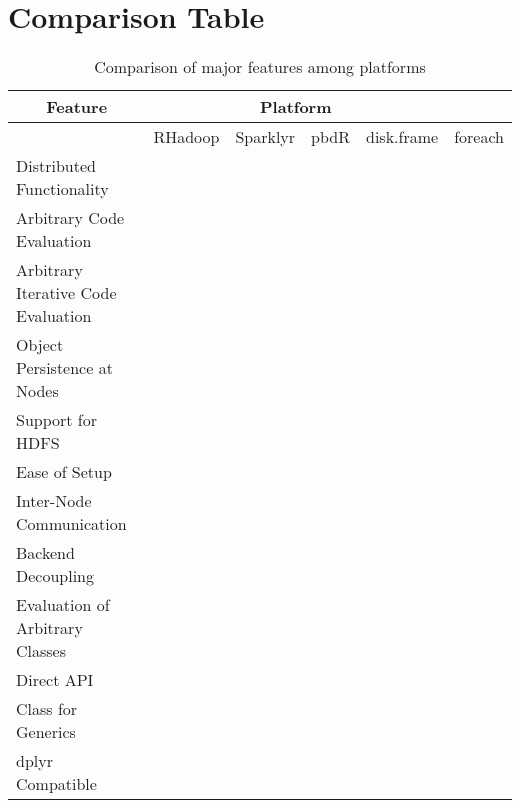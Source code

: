 \documentclass[a4paper,10pt]{article}
\begin{document}
\section{Comparison Table}\label{sec:comp-tab}

\begin{table}[h]
\begin{tabular}{@{}llllll@{}}
\toprule
\multicolumn{1}{c}{Feature}         & \multicolumn{4}{c}{Platform}           &         \\ \midrule
                                    & RHadoop & Sparklyr & pbdR & disk.frame & foreach \\ \cmidrule(l){2-6} 
Distributed Functionality           &         &          &      &            &         \\
Arbitrary Code Evaluation           &         &          &      &            &         \\
Arbitrary Iterative Code Evaluation &         &          &      &            &         \\
Object Persistence at Nodes         &         &          &      &            &         \\
Support for HDFS                    &         &          &      &            &         \\
Ease of Setup                       &         &          &      &            &         \\
Inter-Node Communication            &         &          &      &            &         \\
Backend Decoupling                  &         &          &      &            &         \\
Evaluation of Arbitrary Classes     &         &          &      &            &         \\
Direct API                          &         &          &      &            &         \\
Class for Generics                  &         &          &      &            &         \\
dplyr Compatible                    &         &          &      &            &         \\ \bottomrule
\end{tabular}
\caption{Comparison of major features among platforms\label{tab:compare-features}}
\end{table}
\end{document}
